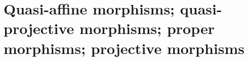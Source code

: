 \section{Quasi-affine morphisms; quasi-projective morphisms; proper morphisms; projective morphisms}
\label{section-quasi-affine-projective-proper-morphisms}

